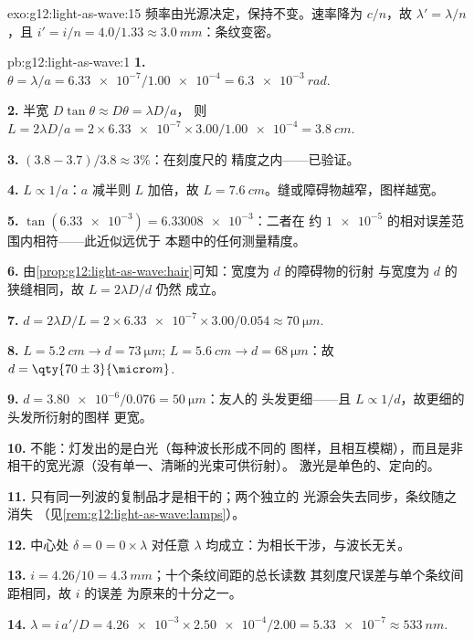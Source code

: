 \begin{solution}{exo:g12:light-as-wave:15}
频率由光源决定，保持不变。速率降为
$c/n$，故 $\lambda' = \lambda/n$，且
$i' = i/n = 4.0/1.33 \approx \qty{3.0}{mm}$：条纹变密。
\end{solution}

\begin{solution}{pb:g12:light-as-wave:1}
\textbf{1.} $\theta = \lambda/a = \num{6.33e-7}/\num{1.00e-4} =
\qty{6.3e-3}{rad}$.

\textbf{2.} 半宽 $D\tan\theta \approx D\theta = \lambda D/a$，
则 $L = 2\lambda D/a = 2 \times \num{6.33e-7} \times
3.00/\num{1.00e-4} = \qty{3.8}{cm}$.

\textbf{3.} $(3.8 - 3.7)/3.8 \approx 3\%$：在刻度尺的
精度之内——已验证。

\textbf{4.} $L \propto 1/a$：$a$ 减半则 $L$ 加倍，故
$L = \qty{7.6}{cm}$。缝或障碍物越窄，图样越宽。

\textbf{5.} $\tan(\num{6.33e-3}) = \num{6.33008e-3}$：二者在
约 $\num{1e-5}$ 的相对误差范围内相符——此近似远优于
本题中的任何测量精度。

\textbf{6.} 由\cref{prop:g12:light-as-wave:hair}可知：宽度为 $d$ 的障碍物的衍射
与宽度为 $d$ 的狭缝相同，故 $L = 2\lambda D/d$ 仍然
成立。

\textbf{7.} $d = 2\lambda D/L = 2 \times \num{6.33e-7} \times
3.00/0.054 \approx \qty{70}{\micro m}$.

\textbf{8.} $L = \qty{5.2}{cm} \to d = \qty{73}{\micro m}$;
$L = \qty{5.6}{cm} \to d = \qty{68}{\micro m}$：故
$d = \qty{70 \pm 3}{\micro m}$.

\textbf{9.} $d = \num{3.80e-6}/0.076 = \qty{50}{\micro m}$：友人的
头发更细——且 $L \propto 1/d$，故更细的头发所衍射的图样
更宽。

\textbf{10.} 不能：灯发出的是白光（每种波长形成不同的
图样，且相互模糊），而且是非相干的宽光源（没有单一、清晰的光束可供衍射）。
激光是单色的、定向的。

\textbf{11.} 只有同一列波的复制品才是相干的；两个独立的
光源会失去同步，条纹随之消失
（见\cref{rem:g12:light-as-wave:lamps}）。

\textbf{12.} 中心处 $\delta = 0 = 0 \times \lambda$ 对任意
$\lambda$ 均成立：为相长干涉，与波长无关。

\textbf{13.} $i = 4.26/10 = \qty{4.3}{mm}$；十个条纹间距的总长读数
其刻度尺误差与单个条纹间距相同，故 $i$ 的误差
为原来的十分之一。

\textbf{14.} $\lambda = i\,a'/D = \num{4.26e-3} \times
\num{2.50e-4}/2.00 = \num{5.33e-7} \approx \qty{533}{nm}$.


\end{solution}
